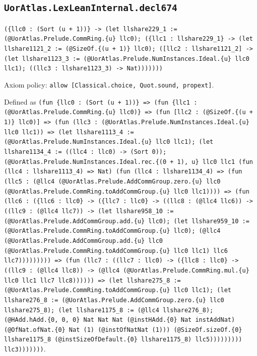 \documentclass[11pt]{article}
\begin{document}
\subsection*{\texttt{UorAtlas.LexLeanInternal.decl674}}
\noindent\texttt{(\{llc0 : (Sort (u + 1))\} -> (let llshare229\_1 := (@UorAtlas.Prelude.CommRing.\{u\} llc0); (\{llc1 : llshare229\_1\} -> (let llshare1121\_2 := (@SizeOf.\{(u + 1)\} llc0); ([llc2 : llshare1121\_2] -> (let llshare1123\_3 := (@UorAtlas.Prelude.NumInstances.Ideal.\{u\} llc0 llc1); ((llc3 : llshare1123\_3) -> Nat)))))))}\par
\noindent Axiom policy: \texttt{allow [Classical.choice, Quot.sound, propext]}.\par
\noindent Defined as \texttt{(fun \{llc0 : (Sort (u + 1))\} => (fun \{llc1 : (@UorAtlas.Prelude.CommRing.\{u\} llc0)\} => (fun [llc2 : (@SizeOf.\{(u + 1)\} llc0)] => (fun (llc3 : (@UorAtlas.Prelude.NumInstances.Ideal.\{u\} llc0 llc1)) => (let llshare1113\_4 := (@UorAtlas.Prelude.NumInstances.Ideal.\{u\} llc0 llc1); (let llshare1134\_4 := ((llc4 : llc0) -> (Sort 0)); (@UorAtlas.Prelude.NumInstances.Ideal.rec.\{(0 + 1), u\} llc0 llc1 (fun (llc4 : llshare1113\_4) => Nat) (fun (llc4 : llshare1134\_4) => (fun (llc5 : (@llc4 (@UorAtlas.Prelude.AddCommGroup.zero.\{u\} llc0 (@UorAtlas.Prelude.CommRing.toAddCommGroup.\{u\} llc0 llc1)))) => (fun (llc6 : (\{llc6 : llc0\} -> (\{llc7 : llc0\} -> ((llc8 : (@llc4 llc6)) -> ((llc9 : (@llc4 llc7)) -> (let llshare958\_10 := (@UorAtlas.Prelude.AddCommGroup.add.\{u\} llc0); (let llshare959\_10 := (@UorAtlas.Prelude.CommRing.toAddCommGroup.\{u\} llc0); (@llc4 (@UorAtlas.Prelude.AddCommGroup.add.\{u\} llc0 (@UorAtlas.Prelude.CommRing.toAddCommGroup.\{u\} llc0 llc1) llc6 llc7))))))))) => (fun (llc7 : ((llc7 : llc0) -> (\{llc8 : llc0\} -> ((llc9 : (@llc4 llc8)) -> (@llc4 (@UorAtlas.Prelude.CommRing.mul.\{u\} llc0 llc1 llc7 llc8)))))) => (let llshare275\_8 := (@UorAtlas.Prelude.CommRing.toAddCommGroup.\{u\} llc0 llc1); (let llshare276\_8 := (@UorAtlas.Prelude.AddCommGroup.zero.\{u\} llc0 llshare275\_8); (let llshare1175\_8 := (@llc4 llshare276\_8); (@HAdd.hAdd.\{0, 0, 0\} Nat Nat Nat (@instHAdd.\{0\} Nat instAddNat) (@OfNat.ofNat.\{0\} Nat (1) (@instOfNatNat (1))) (@SizeOf.sizeOf.\{0\} llshare1175\_8 (@instSizeOfDefault.\{0\} llshare1175\_8) llc5))))))))) llc3)))))))}.\par
\end{document}
